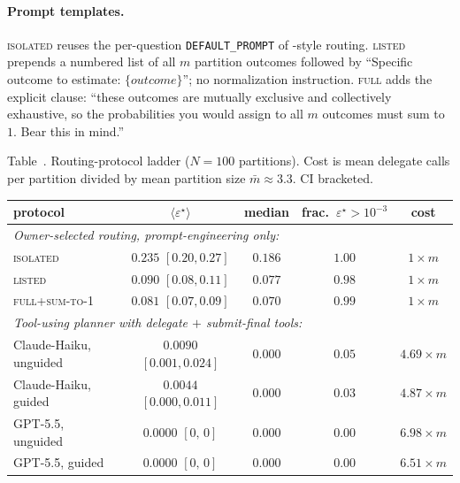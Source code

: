 \documentclass{article}
\theoremstyle{plain}
\theoremstyle{definition}
\theoremstyle{remark}
\newcommand{\eps}{\varepsilon}
\begin{document}
\paragraph{Prompt templates.}
\textsc{isolated} reuses the per-question
\texttt{DEFAULT\_PROMPT}
of \citet{paleka2024consistency}-style routing.
\textsc{listed} prepends a numbered list of all $m$ partition outcomes
followed by ``Specific outcome to estimate: $\{\textit{outcome}\}$'';
no normalization instruction.
\textsc{full} adds the explicit clause: ``these outcomes are mutually
exclusive and collectively exhaustive, so the probabilities you would
assign to all $m$ outcomes must sum to $1$. Bear this in mind.''

\begin{center}
\label{tab:context_full}
{\small Table~\thetable. Routing-protocol ladder ($N\!=\!100$
partitions). Cost is mean delegate calls per partition divided by
mean partition size $\bar m \!\approx\! 3.3$. CI bracketed.\par}
\small
\begin{tabular}{lcccc}
\toprule
protocol & $\langle\eps^\star\rangle$ & median & frac.\ $\eps^\star\!>\!10^{-3}$ & cost \\
\midrule
\multicolumn{5}{l}{\emph{Owner-selected routing, prompt-engineering only:}}\\
\textsc{isolated}             & $0.235$ {\footnotesize $[0.20,0.27]$} & $0.186$ & $1.00$ & $1\!\times\!m$ \\
\textsc{listed}               & $0.090$ {\footnotesize $[0.08,0.11]$} & $0.077$ & $0.98$ & $1\!\times\!m$ \\
\textsc{full+sum-to-1}        & $0.081$ {\footnotesize $[0.07,0.09]$} & $0.070$ & $0.99$ & $1\!\times\!m$ \\
\midrule
\multicolumn{5}{l}{\emph{Tool-using planner with delegate $+$ submit-final tools:}}\\
Claude-Haiku, unguided        & $0.0090$ {\footnotesize $[0.001,0.024]$} & $0.000$ & $0.05$ & $4.69\!\times\!m$ \\
Claude-Haiku, guided          & $0.0044$ {\footnotesize $[0.000,0.011]$} & $0.000$ & $0.03$ & $4.87\!\times\!m$ \\
GPT-5.5,    unguided        & $0.0000$ {\footnotesize $[0,\,0]$}        & $0.000$ & $0.00$ & $6.98\!\times\!m$ \\
GPT-5.5,    guided          & $0.0000$ {\footnotesize $[0,\,0]$}        & $0.000$ & $0.00$ & $6.51\!\times\!m$ \\
\midrule

\end{tabular}
\end{center}
\end{document}
